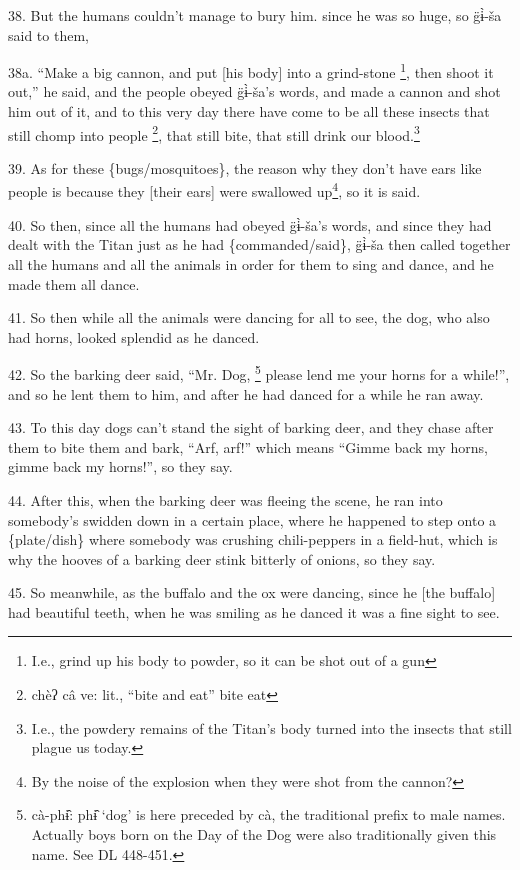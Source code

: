38. But the humans couldn't manage to bury him. since he was so huge, so g̈ɨ̀-ša
said to them,

38a. ``Make a big cannon, and put [his body] into a grind-stone \footnote{I.e., grind up his body to powder, so it can be shot out of a gun}, then shoot
it out,'' he said, and the people obeyed g̈ɨ̀-ša's words, and made a cannon
and shot him out of it, and to this very day there have come to be all these insects
that still chomp into people \footnote{chèʔ câ ve: lit., ``bite and eat''  bite eat}, that still bite, that still drink our blood.\footnote{I.e., the powdery remains of the Titan's body turned into the insects that still plague us today.}

39. As for these \{bugs/mosquitoes\}, the reason why they don't have ears like
people is because they [their ears] were swallowed up\footnote{By the noise of the explosion when they were shot from the cannon?}, so it is said.

40. So then, since all the humans had obeyed g̈ɨ̀-ša's words, and since they
had dealt with the Titan just as he had \{commanded/said\}, g̈ɨ̀-ša then called
together all the humans and all the animals in order for them to sing and dance,
and he made them all dance.

41. So then while all the animals were dancing for all to see, the dog, who also
had horns, looked splendid as he danced.

42. So the barking deer said, ``Mr. Dog, \footnote{cà-phɨ̂: phɨ̂ `dog' is here preceded by cà, the traditional prefix to male names. Actually boys born on the Day of the Dog were also traditionally given this name. See DL 448-451.} please lend me your horns for a while!'',
and so he lent them to him, and after he had danced for a while he ran away.

43. To this day dogs can't stand the sight of barking deer, and they chase after
them to bite them and bark, ``Arf, arf!'' which means ``Gimme back my horns, gimme
back my horns!'', so they say.

44. After this, when the barking deer was fleeing the scene, he ran into somebody's
swidden down in a certain place, where he happened to step onto a \{plate/dish\}
where somebody was crushing chili-peppers in a field-hut, which is why the hooves
of a barking deer stink bitterly of onions, so they say.

45. So meanwhile, as the buffalo and the ox were dancing, since he [the buffalo]
had beautiful teeth, when he was smiling as he danced it was a fine sight to see.

